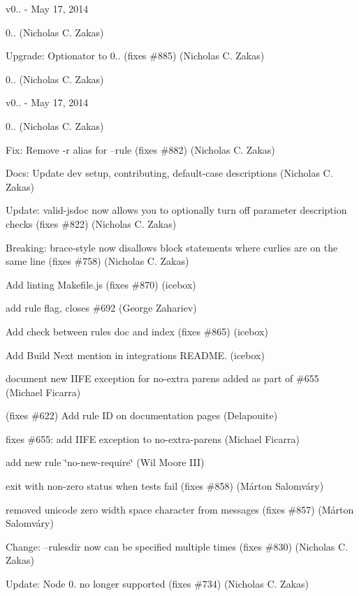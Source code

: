v0.. -\/ May 17, 2014


\begin{DoxyItemize}
\item 0.. (Nicholas C. Zakas)
\item Upgrade\+: Optionator to 0.. (fixes \#885) (Nicholas C. Zakas)
\item 0.. (Nicholas C. Zakas)
\end{DoxyItemize}

v0.. -\/ May 17, 2014


\begin{DoxyItemize}
\item 0.. (Nicholas C. Zakas)
\item Fix\+: Remove -\/r alias for --rule (fixes \#882) (Nicholas C. Zakas)
\item Docs\+: Update dev setup, contributing, default-\/case descriptions (Nicholas C. Zakas)
\item Update\+: valid-\/jsdoc now allows you to optionally turn off parameter description checks (fixes \#822) (Nicholas C. Zakas)
\item Breaking\+: brace-\/style now disallows block statements where curlies are on the same line (fixes \#758) (Nicholas C. Zakas)
\item Add linting Makefile.\+js (fixes \#870) (icebox)
\item add rule flag, closes \#692 (George Zahariev)
\item Add check between rules doc and index (fixes \#865) (icebox)
\item Add Build Next mention in integrations R\+E\+A\+D\+ME. (icebox)
\item document new I\+I\+FE exception for no-\/extra parens added as part of \#655 (Michael Ficarra)
\item (fixes \#622) Add rule ID on documentation pages (Delapouite)
\item fixes \#655\+: add I\+I\+FE exception to no-\/extra-\/parens (Michael Ficarra)
\item add new rule \char`\"{}no-\/new-\/require\char`\"{} (Wil Moore I\+II)
\item exit with non-\/zero status when tests fail (fixes \#858) (Márton Salomváry)
\item removed unicode zero width space character from messages (fixes \#857) (Márton Salomváry)
\item Change\+: --rulesdir now can be specified multiple times (fixes \#830) (Nicholas C. Zakas)
\item Update\+: Node 0. no longer supported (fixes \#734) (Nicholas C. Zakas)

\end{DoxyItemize}
